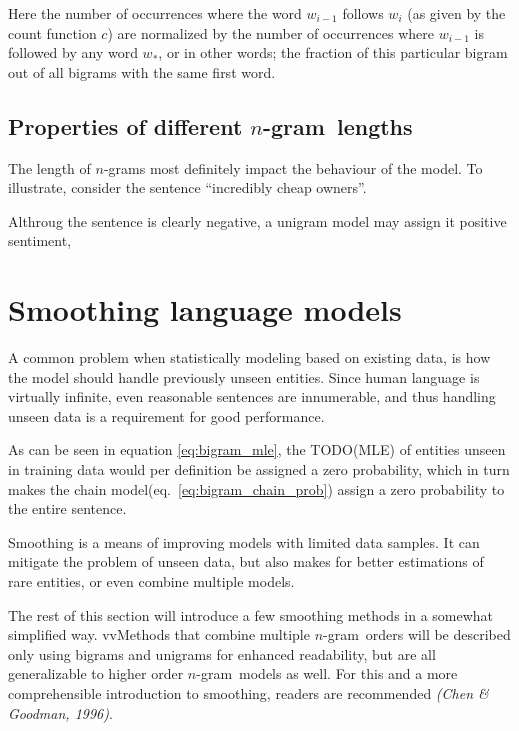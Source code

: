 \documentclass[a4paper,11pt]{kth-mag}
\newcommand{\ngram}{$n$-gram}
\newcommand{\gls}[1]{TODO(#1)}
\begin{document}
Here the number of occurrences where the word $w_{i-1}$ follows $w_i$
(as given by the count function $c$) are normalized by the number of occurrences where $w_{i-1}$
is followed by any word $w_*$, or in other words; the fraction of this particular bigram
out of all bigrams with the same first word.

%




\subsection{Properties of different \ngram~lengths}

The length of \ngram s most definitely impact the behaviour of the model.
To illustrate, consider the sentence ``incredibly cheap owners''.

Althroug the sentence is clearly negative, a unigram model may assign it positive sentiment,

\section{Smoothing language models}
A common problem when statistically modeling based on existing data,
is how the model should handle previously unseen entities.
Since human language is virtually infinite, even reasonable sentences are innumerable,
and thus handling unseen data is a requirement for good performance.

As can be seen in equation \ref{eq:bigram_mle}, the \gls{MLE} of entities unseen in
training data would per definition be assigned a zero probability, which in turn makes
the chain model(eq.~\ref{eq:bigram_chain_prob}) assign a zero probability to the entire
sentence\cite{chen_goodman}.

Smoothing is a means of improving models with limited data samples.
It can mitigate the problem of unseen data,
but also makes for better estimations of rare entities, or even combine multiple models.

The rest of this section will introduce a few smoothing methods in a somewhat simplified way.
vvMethods that combine multiple \ngram~orders will be described only using bigrams and
unigrams for enhanced readability,
but are all generalizable to higher order \ngram~models as well.
For this and a more comprehensible introduction to smoothing,
readers are recommended \emph{(Chen \& Goodman, 1996)}.
\end{document}
